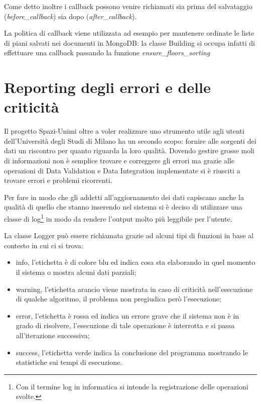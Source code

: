 \documentclass[12pt]{report}
\begin{document}
Come detto inoltre i callback possono venire richiamati sia prima del salvataggio (\textit{before\_callback}) sia dopo (\textit{after\_callback}).

La politica di callback viene utilizzata ad esempio per mantenere ordinate le liste di piani salvati nei documenti in MongoDB: la classe Building si occupa infatti di effettuare una callback passando la funzione \textit{ensure\_floors\_sorting}

\newpage
\section{Reporting degli errori e delle criticità}

Il progetto Spazi-Unimi oltre a voler realizzare uno strumento utile agli utenti dell'Università degli Studi di Milano ha un secondo scopo: fornire alle sorgenti dei dati un riscontro per quanto riguarda la loro qualità.
Dovendo gestire grosse moli di informazioni non è semplice trovare e correggere gli errori ma grazie alle operazioni di Data Validation e Data Integration implementate si è riusciti a trovare errori e problemi ricorrenti.

Per fare in modo che gli addetti all'aggiornamento dei dati capiscano anche la qualità di quello che stanno inserendo nel sistema si è deciso di utilizzare una classe di log\footnote{Con il termine log in informatica si intende la registrazione delle operazioni svolte.} in modo da rendere l'output molto più leggibile per l'utente.

La classe Logger può essere richiamata grazie ad alcuni tipi di funzioni in base al contesto in cui ci si trova:
\begin{itemize}
\item info, l'etichetta è di colore blu ed indica cosa sta elaborando in quel momento il sistema o mostra alcuni dati parziali;
\item warning, l'etichetta arancio viene mostrata in caso di criticità nell'esecuzione di qualche algoritmo, il problema non pregiudica però l'esecuzione;
\item error, l'etichetta è rossa ed indica un errore grave che il sistema non è in grado di risolvere, l'esecuzione di tale operazione è interrotta e si passa all'iterazione successiva;
\item success, l'etichetta verde indica la conclusione del programma mostrando le statistiche sui tempi di esecuzione.
\end{itemize}    
\end{document}
